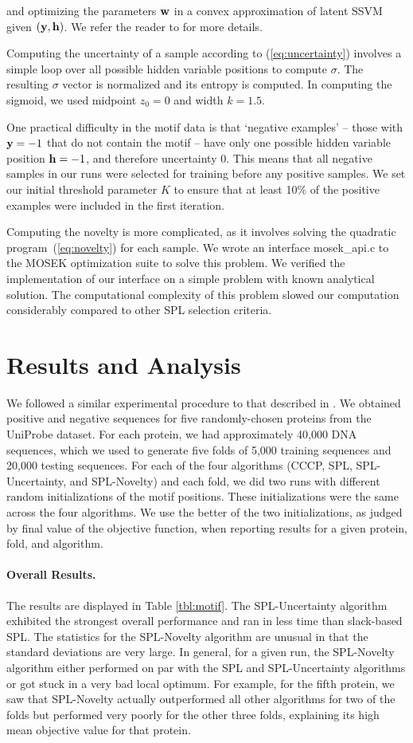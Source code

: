 \documentclass{article}
\newcommand{\mysection}[1]{\vspace{-4mm}\section{#1}\vspace{-4mm}}
\begin{document}
and optimizing the parameters $\bf w$ in a convex approximation of latent SSVM given $(\bf y, \bf h)$.  We refer the reader to \cite{SSVM} for more details.

Computing the uncertainty of a sample according to (\ref{eq:uncertainty}) involves a simple loop over all possible hidden variable positions to compute $\sigma$.  The resulting $\sigma$ vector is normalized and its entropy is computed.  In computing the sigmoid, we used midpoint $z_0=0$ and width $k=1.5$.

One practical difficulty in the motif data is that `negative examples' -- those with ${\bf y}=-1$ that do not contain the motif -- have only one possible hidden variable position ${\bf h}=-1$, and therefore uncertainty 0.  This means that all negative samples in our runs were selected for training before any positive samples.  We set our initial threshold parameter $K$ to ensure that at least 10\% of the positive examples were included in the first iteration. 

Computing the novelty is more complicated, as it involves solving the quadratic program~(\ref{eq:novelty}) for each sample.  We wrote an interface {\sc mosek\_api.c} to the MOSEK optimization suite \cite{Mosek} to solve this problem.  We verified the implementation of our interface on a simple problem with known analytical solution.  The computational complexity of this problem slowed our computation considerably compared to other SPL selection criteria.

\mysection{Results and Analysis}
\label{sec:results}

We followed a similar experimental procedure to that described in \cite{SPL}. We obtained positive and negative sequences for five randomly-chosen proteins from the UniProbe dataset. For each protein, we had approximately 40,000 DNA sequences, which we used  to generate five folds of 5,000 training sequences and 20,000 testing sequences. For each of the four algorithms (CCCP, SPL, SPL-Uncertainty, and SPL-Novelty) and each fold, we did two runs with different random initializations of the motif positions. These initializations were the same across the four algorithms. We use the better of the two initializations, as judged by final value of the objective function, when reporting results for a given protein, fold, and algorithm. 

\paragraph{Overall Results.} The results are displayed in Table \ref{tbl:motif}. The SPL-Uncertainty algorithm exhibited the strongest overall performance and ran in less time than slack-based SPL. The statistics for the SPL-Novelty algorithm are unusual in that the standard deviations are very large. In general, for a given run, the SPL-Novelty algorithm either performed on par with the SPL and SPL-Uncertainty algorithms or got stuck in a very bad local optimum. For example, for the fifth protein, we saw that SPL-Novelty actually outperformed all other algorithms for two of the folds but performed very poorly for the other three folds, explaining its high mean objective value for that protein. 
\end{document}
